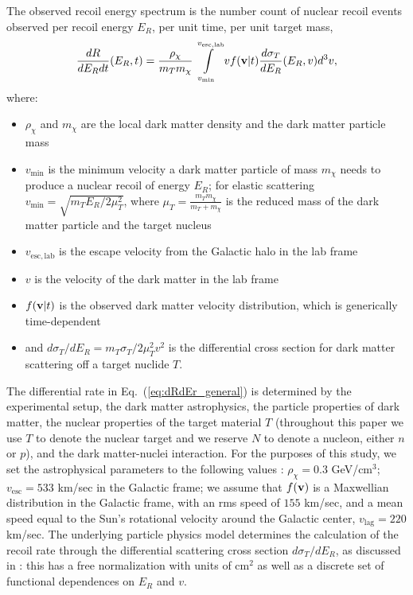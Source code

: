 \documentclass[11pt]{article}
\newcommand{\Eq}[1]{Eq.~(\ref{#1})} \newcommand{\Eqs}[2]{Eqs.~(\ref{#1}) and (\ref{#2})} \newcommand{\Eqm}[2]{Eqs.~(\ref{#1}) through (\ref{#2})}
\begin{document}
The observed recoil energy spectrum is the number count of nuclear recoil events observed per recoil energy $E_R$, per unit time, per unit target mass,
\begin{equation}
\frac{dR}{dE_R dt}(E_R,t) =  \frac{\rho_\chi}{m_T m_\chi} \int\limits_{v_{\mathrm{min}}}^{v_{\mathrm{esc, lab}}}  v f(\mathrm{\mbox{\bf{v}}}|t) \frac{d\sigma_T}{dE_R} (E_R,v) d^3v ,
\label{eq:dRdEr_general}
\end{equation}
where:
\begin{itemize}
\item $\rho_\chi$ and $m_\chi$ are the local dark matter density and the dark matter particle mass
\item $v_\mathrm{min}$ is the minimum velocity a dark matter particle of mass $m_\chi$ needs to produce a nuclear recoil of energy $E_R$; for elastic scattering $v_\mathrm{min} = \sqrt{m_T E_R/2\mu_T^2}$, where $\mu_T=\frac{m_Tm_\chi}{m_T+m_\chi}$ is the reduced mass of the dark matter particle and the target nucleus
\item $v_{\mathrm{esc, lab}}$ is the escape velocity from the Galactic halo in the lab frame
\item $v$ is the velocity of the dark matter in the lab frame
\item $f(\mathrm{\mbox{\bf{v}}}|t)$ is the observed dark matter velocity distribution, which is generically time-dependent
\item and $d\sigma_T/dE_R=m_T \sigma_T /2\mu_T^2 v^2$ is the differential cross section for dark matter scattering off a target nuclide $T$.
\end{itemize}

The differential rate in \Eq{eq:dRdEr_general} is determined by the experimental setup, the dark matter astrophysics, the particle properties of dark matter, the nuclear properties of the target material $T$ (throughout this paper we use $T$ to denote the nuclear target and we reserve $N$ to denote a nucleon, either $n$ or $p$), and the dark matter-nuclei interaction. For the purposes of this study, we set the astrophysical parameters to the following values \cite{Bovy:2013raa,Piffl:2013mla}: $\rho_\chi=0.3$ GeV/cm$^3$; $v_{\mathrm{esc}} = 533$ km/sec in the Galactic frame; we assume that $f(\mathrm{\mbox{\bf{v}}})$ is a Maxwellian distribution in the Galactic frame, with an rms speed of $155$ km/sec, and a mean speed equal to the Sun's rotational velocity around the Galactic center, $v_\textrm{lag}=220$ km/sec. The underlying particle physics model determines the calculation of the recoil rate through the differential scattering cross section ${d\sigma_T}/{dE_R}$, as discussed in \cite{Gluscevic:2015sqa,Gresham:2014vja}: this has a free normalization with units of cm${}^2$ as well as a discrete set of functional dependences on $E_R$ and $v$.
\end{document}
